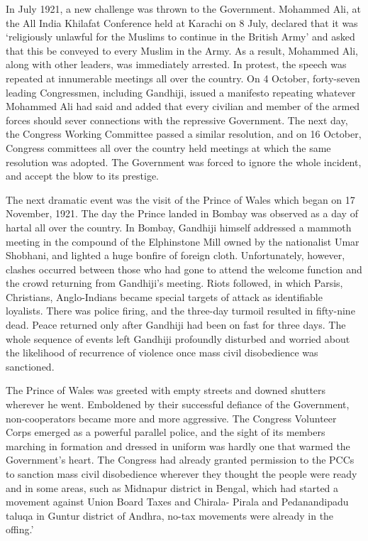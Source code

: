 In July 1921, a new challenge was thrown to the Government. Mohammed Ali, at the All India Khilafat Conference held at Karachi on 8 July, declared that it was `religiously unlawful for the Muslims to continue in the British Army' and asked that this be conveyed to every Muslim in the Army. As a result, Mohammed Ali, along with other leaders, was immediately arrested. In protest, the speech was repeated at innumerable meetings all over the country. On 4 October, forty-seven leading Congressmen, including Gandhiji, issued a manifesto repeating whatever Mohammed Ali had said and added that every civilian and member of the armed forces should sever connections with the repressive Government. The next day, the Congress Working Committee passed a similar resolution, and on 16 October, Congress committees all over the country held meetings at which the same resolution was adopted. The Government was forced to ignore the whole incident, and accept the blow to its prestige. 

The next dramatic event was the visit of the Prince of Wales which began on 17 November, 1921. The day the Prince landed in Bombay was observed as a day of hartal all over the country. In Bombay, Gandhiji himself addressed a mammoth meeting in the compound of the Elphinstone Mill owned by the nationalist Umar Shobhani, and lighted a huge bonfire of foreign cloth. Unfortunately, however, clashes occurred between those who had gone to attend the welcome function and the crowd returning from Gandhiji's meeting. Riots followed, in which Parsis, Christians, Anglo-Indians became special targets of attack as identifiable loyalists. There was police firing, and the three-day turmoil resulted in fifty-nine dead. Peace returned only after Gandhiji had been on fast for three days. The whole sequence of events left Gandhiji profoundly disturbed and worried about the likelihood of recurrence of violence once mass civil disobedience was sanctioned. 

The Prince of Wales was greeted with empty streets and downed shutters wherever he went. Emboldened by their successful defiance of the Government, non-cooperators became more and more aggressive. The Congress Volunteer Corps emerged as a powerful parallel police, and the sight of its members marching in formation and dressed in uniform was hardly one that warmed the Government's heart. The Congress had already granted permission to the PCCs to sanction mass civil disobedience wherever they thought the people were ready and in some areas, such as Midnapur district in Bengal, which had started a movement against Union Board Taxes and Chirala- Pirala and Pedanandipadu taluqa in Guntur district of Andhra, no-tax movements were already in the offing.' 


